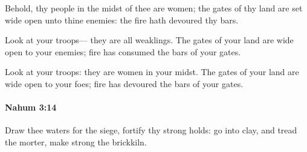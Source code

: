 			\begin{versebox}
					\item[BHS] 
					\item[LXX] 
					\item[ASV] Behold, thy people in the midst of thee are women; the gates of thy land are set wide open unto thine enemies: the fire hath devoured thy bars.
					\item[NIV] Look at your troops— they are all weaklings. The gates of your land are wide open to your enemies; fire has consumed the bars of your gates.
					\item[NRSV] Look at your troops: they are women in your midst. The gates of your land are wide open to your foes; fire has devoured the bars of your gates.
			\end{versebox}

		\paragraph{Nahum 3:14} %
			\label{NAHUM-3-14}

			Draw thee waters for the siege, fortify thy strong holds: go into clay, and tread the morter, make strong the brickkiln.

